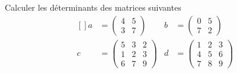 \begin{exercice}\label{exoLineraire0029}

	Calculer les déterminants des matrices suivantes
	\begin{equation}
		\begin{aligned}[]
			a&=\begin{pmatrix}
				4	&	5	\\ 
				3	&	7	
			\end{pmatrix}
			&b&=\begin{pmatrix}
				0	&	5	\\ 
				7	&	2	
			\end{pmatrix}\\
			c&=\begin{pmatrix}
				  5	&	3	&	2\\ 
				    1	&	2	&	3\\ 
				     6	&	7	& 9	  
			     \end{pmatrix}
			&d&=\begin{pmatrix}
				  1	&	2	&	3\\ 
				    4	&	5	&	6\\ 
				     7	&	8	& 9	  
			     \end{pmatrix}
		\end{aligned}
	\end{equation}
			

\end{exercice}
